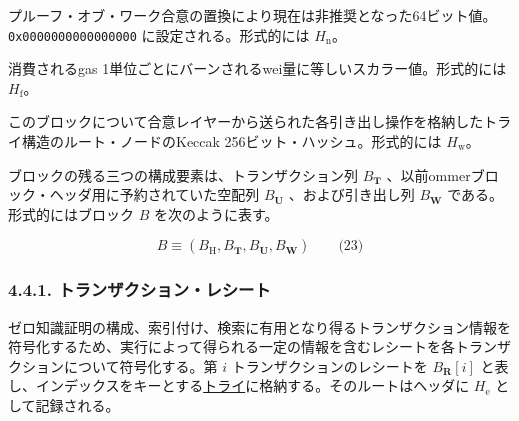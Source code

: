 \documentclass[
]{ltjsarticle}
\providecommand{\tightlist}{%
  \setlength{\itemsep}{0pt}\setlength{\parskip}{0pt}}
\begin{document}
\protect\hypertarget{H__n}{}{}

\begin{description}
\tightlist
\item[nonce]
プルーフ・オブ・ワーク合意の置換により現在は非推奨となった64ビット値。\texttt{0x0000000000000000}
に設定される。形式的には \protect\hyperlink{H__n}{\(H_{\mathrm{n}}\)}。
\end{description}

\protect\hypertarget{block_baseFeePerGas_H__f}{}{}

\begin{description}
\tightlist
\item[baseFeePerGas]
消費されるgas 1単位ごとにバーンされるwei量に等しいスカラー値。形式的には
\protect\hyperlink{H__f}{\(H_{\mathrm{f}}\)}。
\end{description}

\protect\hypertarget{H__w}{}{}

\begin{description}
\tightlist
\item[withdrawalsRoot]
このブロックについて合意レイヤーから送られた各引き出し操作を格納したトライ構造のルート・ノードのKeccak
256ビット・ハッシュ。形式的には
\protect\hyperlink{H__w}{\(H_{\mathrm{w}}\)}。
\end{description}

ブロックの残る三つの構成要素は、トランザクション列 \(B_{\mathbf{T}}\)
、以前ommerブロック・ヘッダ用に予約されていた空配列 \(B_{\mathbf{U}}\)
、および引き出し列 \(B_{\mathbf{W}}\) である。形式的にはブロック \(B\)
を次のように表す。

\protect\hypertarget{eq-23}{}{}

\[B \equiv (B_{\mathrm{H}}, B_{\mathbf{T}}, B_{\mathbf{U}}, B_{\mathbf{W}}) \qquad \text{(23)}\]

\protect\hypertarget{Transaction_Receipt}{}{}

\hypertarget{ux30c8ux30e9ux30f3ux30b6ux30afux30b7ux30e7ux30f3ux30ecux30b7ux30fcux30c8}{%
\subsubsection{4.4.1.
トランザクション・レシート}\label{ux30c8ux30e9ux30f3ux30b6ux30afux30b7ux30e7ux30f3ux30ecux30b7ux30fcux30c8}}

ゼロ知識証明の構成、索引付け、検索に有用となり得るトランザクション情報を符号化するため、実行によって得られる一定の情報を含むレシートを各トランザクションについて符号化する。第
\(i\) トランザクションのレシートを \(B_{\mathbf{R}}[i]\)
と表し、インデックスをキーとする\protect\hyperlink{trie}{トライ}に格納する。そのルートはヘッダに
\protect\hyperlink{Receipts_Root_H__e}{\(H_{\mathrm{e}}\)}
として記録される。
\end{document}
